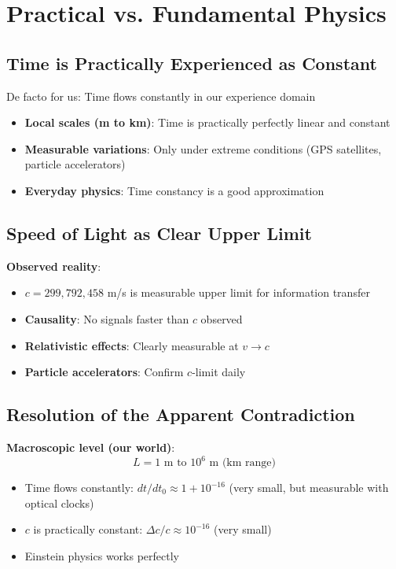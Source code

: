 	\section{Practical vs. Fundamental Physics}
	
	\subsection{Time is Practically Experienced as Constant}
	
	De facto for us: Time flows constantly in our experience domain
	\begin{itemize}
		\item \textbf{Local scales (m to km)}: Time is practically perfectly linear and constant
		\item \textbf{Measurable variations}: Only under extreme conditions (GPS satellites, particle accelerators)
		\item \textbf{Everyday physics}: Time constancy is a good approximation
	\end{itemize}
	
	\subsection{Speed of Light as Clear Upper Limit}
	
	\textbf{Observed reality}:
	\begin{itemize}
		\item $c = 299,792,458$ m/s is measurable upper limit for information transfer
		\item \textbf{Causality}: No signals faster than $c$ observed
		\item \textbf{Relativistic effects}: Clearly measurable at $v \rightarrow c$
		\item \textbf{Particle accelerators}: Confirm $c$-limit daily
	\end{itemize}
	
	\subsection{Resolution of the Apparent Contradiction}
	
	\textbf{Macroscopic level (our world)}:
	\begin{equation}
		L = 1 \text{ m to } 10^6 \text{ m (km range)}
	\end{equation}
	
	\begin{itemize}
		\item Time flows constantly: $dt/dt_0 \approx 1 + 10^{-16}$ (very small, but measurable with optical clocks)
		\item $c$ is practically constant: $\Delta c/c \approx 10^{-16}$ (very small)
		\item Einstein physics works perfectly
	\end{itemize}
	
